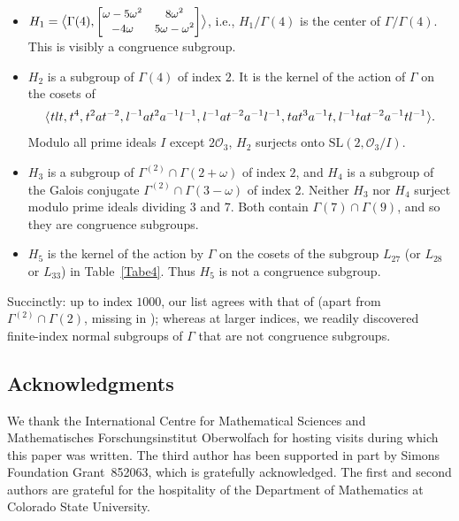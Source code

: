 \documentclass[11pt]{amsart}
\theoremstyle{definition}
\theoremstyle{remark}
\newcommand{\G}{{\Gamma}}
\newcommand{\SL}{\mathrm{SL}}
\begin{document}
\begin{itemize}
\item
 $H_1= \big\langle \Gamma(4),
{\small \begin{bmatrix}
\omega-5\omega^2&8\omega^2\\
\vspace{-10pt}&\\
-4\omega&5\omega-\omega^2\end{bmatrix}}
\big\rangle$, i.e., $H_1/\Gamma(4)$
is the center of $\Gamma/\Gamma(4)$.
This is visibly a congruence subgroup.
\item $H_2$ is a subgroup of $\Gamma(4)$ of index $2$. 
It is the kernel of the action of $\Gamma$ on the cosets 
of
\[
\langle \hspace{.75pt} tlt, \hspace{.5pt} t^4, 
\hspace{.5pt} 
t^2at^{-2}, \hspace{.5pt} 
l^{-1}at^2a^{-1}l^{-1}, \hspace{.5pt}  
l^{-1}at^{-2}a^{-1}l^{-1},
\hspace{.5pt} 
tat^3a^{-1}t, 
\hspace{.5pt} 
 l^{-1}tat^{-2}a^{-1}tl^{-1}  \hspace{.75pt} \rangle .
\]
Modulo all prime ideals $I$ 
except $2\mathcal{O}_3$, $H_2$ 
surjects onto  $\SL(2,\mathcal{O}_3/I)$.
\item $H_3$ is a subgroup of 
$\Gamma^{(2)}\cap\Gamma(2+\omega)$
 of index $2$, and $H_4$ is a subgroup 
of the Galois conjugate
 $\Gamma^{(2)}\cap\Gamma(3-\omega)$
of index $2$. 
Neither $H_3$ nor $H_4$ surject modulo 
prime ideals dividing $3$ and $7$. Both contain
$\Gamma(7)\cap\Gamma(9)$,
and so they are congruence subgroups.
\item
$H_5$ is the kernel of the action by $\Gamma$ on the cosets 
of the subgroup $L_{27}$ (or  $L_{28}$ or  $L_{33}$) in 
Table~\ref{Tabe4}. Thus $H_5$ is not a congruence subgroup.
\end{itemize}

Succinctly: up to index $1000$, our list 
agrees with  that of \cite{Alperin}  (apart from 
$\Gamma^{(2)}\cap\Gamma(2)$, missing in \cite{Alperin});
whereas at larger indices, we readily discovered
 finite-index normal subgroups of $\G$ that are not 
congruence subgroups.


\subsection*{Acknowledgments}
We thank the International Centre for Mathematical Sciences
and Mathematisches Forschungsinstitut Oberwolfach 
 for hosting visits during which this paper was 
written. The third author has been supported in part by
Simons Foundation Grant~852063, which is gratefully 
acknowledged. The first and second authors are grateful for
the hospitality of the Department of Mathematics at 
Colorado State University.
\end{document}
